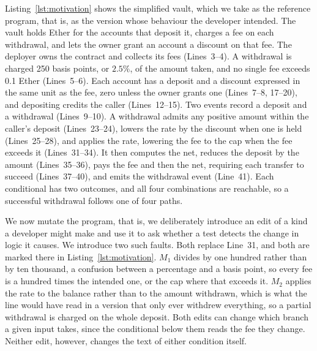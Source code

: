 \documentclass[manuscript,anonymous]{acmart}
\begin{document}
Listing~\ref{lst:motivation} shows the simplified vault, which we take as the
reference program, that is, as the version whose behaviour the developer
intended. The vault holds Ether for the accounts that deposit it, charges a fee
on each withdrawal, and lets the owner grant an account a discount on that fee.
The deployer owns the contract and collects its fees (Lines~3--4). A
withdrawal is charged 250 basis points, or $2.5\%$, of the amount taken, and no
single fee exceeds 0.1 Ether (Lines~5--6). Each account has a deposit and a
discount expressed in the same unit as the fee, zero unless the owner grants one
(Lines~7--8, 17--20), and depositing credits the caller (Lines~12--15). Two
events record a deposit and a withdrawal (Lines~9--10). A withdrawal admits any
positive amount within the caller's deposit (Lines~23--24), lowers the rate by
the discount when one is held (Lines~25--28), and applies the rate, lowering the
fee to the cap when the fee exceeds it (Lines~31--34). It then computes the net,
reduces the deposit by the amount (Lines~35--36), pays the fee and then the net,
requiring each transfer to succeed (Lines~37--40), and emits the withdrawal
event (Line~41). Each conditional has two outcomes, and all four
combinations are reachable, so a successful withdrawal follows one of four
paths.

We now mutate the program, that is, we deliberately introduce an edit of a kind
a developer might make and use it to ask whether a test detects the change in
logic it causes. We introduce two such faults. Both replace Line~31, and both
are marked there in Listing~\ref{lst:motivation}. $M_1$ divides by one hundred
rather than by ten thousand, a confusion between a percentage and a basis
point, so every fee is a hundred times the intended one, or the cap where that
exceeds it. $M_2$ applies the rate to the balance rather than to the amount
withdrawn, which is what the line would have read in a version that only ever
withdrew everything, so a partial withdrawal is charged on the whole deposit.
Both edits can change which branch a given input takes, since the conditional
below them reads the fee they change. Neither edit, however, changes the text
of either condition itself.
\end{document}
